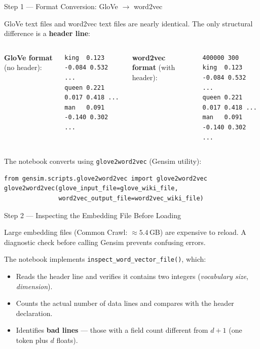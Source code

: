 \documentclass[11pt,aspectratio=169,professionalfonts]{beamer}
\begin{document}
\begin{frame}[fragile]{Step 1 — Format Conversion: GloVe $\to$ word2vec}

GloVe text files and word2vec text files are nearly identical.
The only structural difference is a \textbf{header line}:

\medskip
\begin{columns}[T]
\textbf{GloVe format} (no header):
\begin{lstlisting}
king  0.123 -0.084 0.532 ...
queen 0.221  0.017 0.418 ...
man   0.091 -0.140 0.302 ...
\end{lstlisting}

\textbf{word2vec format} (with header):
\begin{lstlisting}
400000 300
king  0.123 -0.084 0.532 ...
queen 0.221  0.017 0.418 ...
man   0.091 -0.140 0.302 ...
\end{lstlisting}
\end{columns}

\medskip
The notebook converts using \texttt{glove2word2vec} (Gensim utility):
\begin{lstlisting}
from gensim.scripts.glove2word2vec import glove2word2vec
glove2word2vec(glove_input_file=glove_wiki_file,
               word2vec_output_file=word2vec_wiki_file)
\end{lstlisting}
\end{frame}
%
%
\begin{frame}[fragile]{Step 2 — Inspecting the Embedding File Before Loading}

Large embedding files (Common Crawl: $\approx 5.4$\,GB) are expensive to
reload. A diagnostic check before calling Gensim prevents confusing errors.

\medskip
The notebook implements \texttt{inspect\_word\_vector\_file()}, which:

\begin{itemize}
  \item Reads the header line and verifies it contains two integers
        (\emph{vocabulary size}, \emph{dimension}).
  \item Counts the actual number of data lines and compares with the header
        declaration.
  \item Identifies \textbf{bad lines} — those with a field count different
        from $d+1$ (one token plus $d$ floats).
\end{itemize}
\end{frame}
\end{document}
